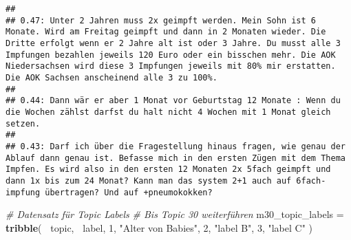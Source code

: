 \documentclass[
]{book}
\newenvironment{Shaded}{\begin{snugshade}}{\end{snugshade}}
\newcommand{\CommentTok}[1]{\textcolor[rgb]{0.56,0.35,0.01}{\textit{#1}}}
\newcommand{\DecValTok}[1]{\textcolor[rgb]{0.00,0.00,0.81}{#1}}
\newcommand{\KeywordTok}[1]{\textcolor[rgb]{0.13,0.29,0.53}{\textbf{#1}}}
\newcommand{\NormalTok}[1]{#1}
\newcommand{\OperatorTok}[1]{\textcolor[rgb]{0.81,0.36,0.00}{\textbf{#1}}}
\newcommand{\StringTok}[1]{\textcolor[rgb]{0.31,0.60,0.02}{#1}}
\begin{document}
\begin{verbatim}
## 
## 0.47: Unter 2 Jahren muss 2x geimpft werden. Mein Sohn ist 6 Monate. Wird am Freitag geimpft und dann in 2 Monaten wieder. Die Dritte erfolgt wenn er 2 Jahre alt ist oder 3 Jahre. Du musst alle 3 Impfungen bezahlen jeweils 120 Euro oder ein bisschen mehr. Die AOK Niedersachsen wird diese 3 Impfungen jeweils mit 80% mir erstatten. Die AOK Sachsen anscheinend alle 3 zu 100%.
## 
## 0.44: Dann wär er aber 1 Monat vor Geburtstag 12 Monate : Wenn du die Wochen zählst darfst du halt nicht 4 Wochen mit 1 Monat gleich setzen.
## 
## 0.43: Darf ich über die Fragestellung hinaus fragen, wie genau der Ablauf dann genau ist. Befasse mich in den ersten Zügen mit dem Thema Impfen. Es wird also in den ersten 12 Monaten 2x 5fach geimpft und dann 1x bis zum 24 Monat? Kann man das system 2+1 auch auf 6fach-impfung übertragen? Und auf +pneumokokken?
\end{verbatim}

\begin{Shaded}
\begin{Highlighting}[]
\CommentTok{# Datensatz für Topic Labels}
\CommentTok{# Bis Topic 30 weiterführen}
\NormalTok{m30_topic_labels =}\StringTok{ }\KeywordTok{tribble}\NormalTok{(}
  \OperatorTok{~}\NormalTok{topic, }\OperatorTok{~}\NormalTok{label,}
  \DecValTok{1}\NormalTok{,      }\StringTok{"Alter von Babies"}\NormalTok{,}
  \DecValTok{2}\NormalTok{,      }\StringTok{"label B"}\NormalTok{,}
  \DecValTok{3}\NormalTok{,      }\StringTok{"label C"}
\NormalTok{)}
\end{Highlighting}
\end{Shaded}
\end{document}
